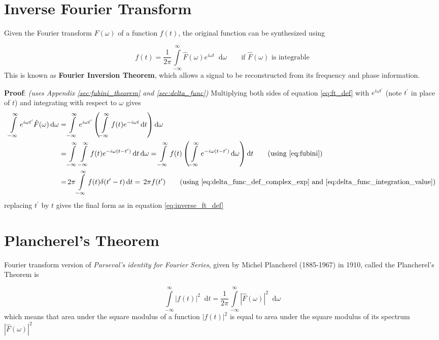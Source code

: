 \documentclass[11pt, a4paper]{article}
\let\oldsection\section
\renewcommand{\section}{%
	\setcounter{equation}{0}%
	\oldsection%
}
\newcommand{\quotedsingle}[1]{#1}	%
\newcommand{\quotedsingleit}[1]{\quotedsingle{\textit{#1}}}	%
\newcommand{\eqrefnp}[1]{\textup{\ref{#1}}}  %
\newcommand{\primed}[1]{#1^{\prime}}
\newcommand{\tp}{\primed{t}}	%
\newcommand{\diff}{\mathop{}\!\mathrm{d}}
\newcommand{\dt}{\diff t}
\newcommand{\domega}{\diff \omega}
\newcommand{\dint}[2]{\int \limits_{#1}^{#2}}  %
\newcommand{\intinfty}{\dint{-\infty}{\infty}}	%
\newcommand{\iintinfty}{\intinfty \intinfty}	%
\begin{document}
	\section{Inverse Fourier Transform}\label{sec:inverse_fourier_transform}
	Given the Fourier transform $\hat{F}(\omega)$ of a function $f(t)$, the original function can be synthesized using
	
	\begin{equation}\label{eq:inverse_ft_def}
		\boxed{
			f(t) = \frac{1}{2\pi} \intinfty \hat{F}(\omega)e^{i\omega t} \domega
		} \qquad \text{if $\hat{F}(\omega)$ is integrable}
	\end{equation}
	This is known as \textbf{Fourier Inversion Theorem}, which allows a signal to be reconstructed from its frequency and phase information. \cite{herman2016fourieranalysis}
	
	\vspace{4pt}
	\textbf{Proof}: \textit{(uses Appendix \ref{sec:fubini_theorem} and \ref{sec:delta_func})} Multiplying both sides of equation \eqref{eq:ft_def} with $e^{i\omega \tp}$ (note $\tp$ in place of $t$) and integrating with respect to $\omega$ gives
	\begin{align*}
		\intinfty e^{i\omega \tp} \hat{F}(\omega) \domega 
		= & \intinfty e^{i\omega \tp} \left(\intinfty f(t) e^{-i\omega t} \dt \right) \domega \\
		= & \iintinfty f(t) e^{-i\omega (t - \tp)} \dt \domega
		= \intinfty f(t) \left(\intinfty  e^{-i\omega (t - \tp)} \domega \right) \dt \tag{using \eqrefnp{eq:fubini}} \\
		= & \, 2 \pi \intinfty f(t) \delta (\tp - t) \dt = \, 2 \pi f(\tp) \tag{using \eqrefnp{eq:delta_func_def_complex_exp} and \eqrefnp{eq:delta_func_integration_value}}
	\end{align*} 
	replacing $\tp$ by $t$ gives the final form as in equation \eqref{eq:inverse_ft_def}
	
	\section{Plancherel's Theorem}\label{sec:plancherel_theorem}
	Fourier transform version of \quotedsingleit{Parseval's identity for Fourier Series}, given by Michel Plancherel (1885-1967) in 1910, called the Plancherel's Theorem is \cite{herman2016fourieranalysis}
	
	\begin{equation}\label{eq:plancherel_theorem}
		\intinfty |f(t)|^{2} \dt = \frac{1}{2 \pi} \intinfty |\hat{F}(\omega)|^{2} \domega
	\end{equation}
	which means that area under the square modulus of a function $|f(t)|^{2}$ is equal to area under the square modulus of its spectrum $|\hat{F}(\omega)|^{2}$
	
\end{document}
